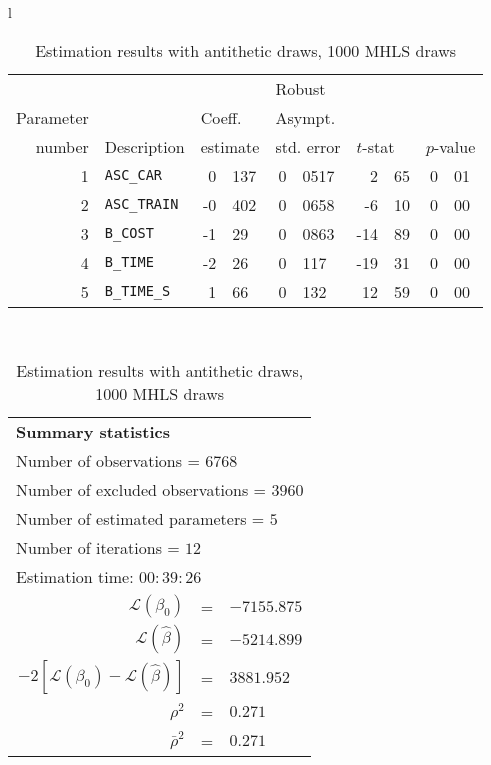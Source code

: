\documentclass[12pt,a4paper]{article}
\begin{document}
\begin{table}[htb]
  \begin{tabular}{l}
\begin{tabular}{rlr@{.}lr@{.}lr@{.}lr@{.}l}
         &                       &   \multicolumn{2}{l}{}    & \multicolumn{2}{l}{Robust}  &     \multicolumn{4}{l}{}   \\
Parameter &                       &   \multicolumn{2}{l}{Coeff.}      & \multicolumn{2}{l}{Asympt.}  &     \multicolumn{4}{l}{}   \\
number &  Description                     &   \multicolumn{2}{l}{estimate}      & \multicolumn{2}{l}{std. error}  &   \multicolumn{2}{l}{$t$-stat}  &   \multicolumn{2}{l}{$p$-value}   \\

\hline

1 & \lstinline$ASC_CAR$ & 0&137 & 0&0517 & 2&65 & 0&01\\
2 & \lstinline$ASC_TRAIN$ & -0&402 & 0&0658 & -6&10 & 0&00\\
3 & \lstinline$B_COST$ & -1&29 & 0&0863 & -14&89 & 0&00\\
4 & \lstinline$B_TIME$ & -2&26 & 0&117 & -19&31 & 0&00\\
5 & \lstinline$B_TIME_S$ & 1&66 & 0&132 & 12&59 & 0&00\\
\hline
\end{tabular}
\\
\begin{tabular}{rcl}
\multicolumn{3}{l}{\bf Summary statistics}\\
\multicolumn{3}{l}{ Number of observations = $6768$} \\
\multicolumn{3}{l}{ Number of excluded observations = $3960$} \\
\multicolumn{3}{l}{ Number of estimated  parameters = $5$} \\
\multicolumn{3}{l}{ Number of iterations = $12$} \\
\multicolumn{3}{l}{ Estimation time: $00:39:26$} \\
 $\mathcal{L}(\beta_0)$ &=&  $-7155.875$ \\
 $\mathcal{L}(\hat{\beta})$ &=& $-5214.899 $  \\
 $-2[\mathcal{L}(\beta_0) -\mathcal{L}(\hat{\beta})]$ &=& $3881.952$ \\
    $\rho^2$ &=&   $0.271$ \\
    $\bar{\rho}^2$ &=&    $0.271$ \\
\end{tabular}
  \end{tabular}
\caption{\label{tab:estAnti}Estimation results with antithetic
  draws, 1000 MHLS draws}
\end{table}
\end{document}
